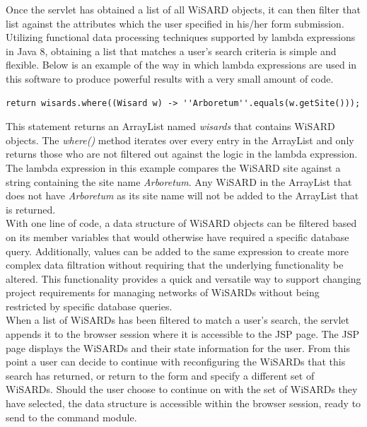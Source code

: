 Once the servlet has obtained a list of all WiSARD objects, it can then filter that list against the attributes which the user specified in his/her form submission. Utilizing functional data processing techniques supported by lambda expressions in Java 8, obtaining a list that matches a user's search criteria is simple and flexible. Below is an example of the way in which lambda expressions are used in this software to produce powerful results with a very small amount of code.\\ 

\begin{lstlisting}
return wisards.where((Wisard w) -> ''Arboretum''.equals(w.getSite()));
\end{lstlisting}

This statement returns an ArrayList named \textit{wisards} that contains WiSARD objects. The \textit{where()} method iterates over every entry in the ArrayList and only returns those who are not filtered out against the logic in the lambda expression. The lambda expression in this example compares the WiSARD site against a string containing the site name \textit{Arboretum}. Any WiSARD in the ArrayList that does not have \textit{Arboretum} as its site name will not be added to the ArrayList that is returned.\\

With one line of code, a data structure of WiSARD objects can  be filtered based on its member variables that would otherwise have required a specific database query. Additionally, values can be added to the same expression to create more complex data filtration without requiring that the underlying functionality be altered. This functionality provides a quick and versatile way to support changing project requirements for managing networks of WiSARDs without being restricted by specific database queries.\\

When a list of WiSARDs has been filtered to match a user's search, the servlet appends it to the browser session where it is accessible to the JSP page. The JSP page displays the WiSARDs and their state information for the user. From this point a user can decide to continue with reconfiguring the WiSARDs that this search has returned, or return to the form and specify a different set of WiSARDs. Should the user choose to continue on with the set of WiSARDs they have selected, the data structure is accessible within the browser session, ready to send to the command module.\\

